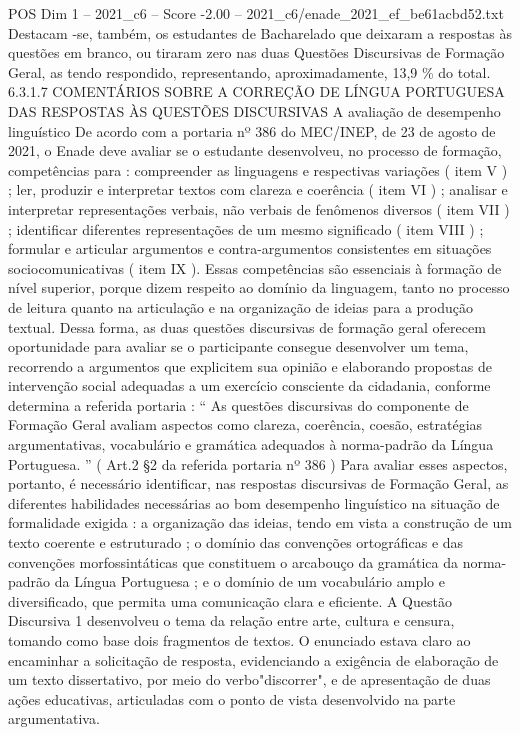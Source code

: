 \begin{textsample}{POS Dim 1 – 2021\_c6 – Score -2.00 – 2021\_c6/enade\_2021\_ef\_be61acbd52.txt}
Destacam -se, também, os estudantes de Bacharelado que deixaram a respostas às questões em branco, ou tiraram zero nas duas Questões Discursivas de Formação Geral, as tendo respondido, representando, aproximadamente, 13,9 \% do total. 6.3.1.7 COMENTÁRIOS SOBRE A CORREÇÃO DE LÍNGUA PORTUGUESA DAS RESPOSTAS ÀS QUESTÕES DISCURSIVAS A avaliação de desempenho linguístico De acordo com a portaria nº 386 do MEC/INEP, de 23 de agosto de 2021, o Enade deve avaliar se o estudante desenvolveu, no processo de formação, competências para : compreender as linguagens e respectivas variações ( item V ) ; ler, produzir e interpretar textos com clareza e coerência ( item VI ) ; analisar e interpretar representações verbais, não verbais de fenômenos diversos ( item VII ) ; identificar diferentes representações de um mesmo significado ( item VIII ) ; formular e articular argumentos e contra-argumentos consistentes em situações sociocomunicativas ( item IX ).
Essas competências são essenciais à formação de nível superior, porque dizem respeito ao domínio da linguagem, tanto no processo de leitura quanto na articulação e na organização de ideias para a produção textual.
Dessa forma, as duas questões discursivas de formação geral oferecem oportunidade para avaliar se o participante consegue desenvolver um tema, recorrendo a argumentos que explicitem sua opinião e elaborando propostas de intervenção social adequadas a um exercício consciente da cidadania, conforme determina a referida portaria : “ As questões discursivas do componente de Formação Geral avaliam aspectos como clareza, coerência, coesão, estratégias argumentativas, vocabulário e gramática adequados à norma-padrão da Língua Portuguesa. ” ( Art.2 §2 da referida portaria nº 386 ) Para avaliar esses aspectos, portanto, é necessário identificar, nas respostas discursivas de Formação Geral, as diferentes habilidades necessárias ao bom desempenho linguístico na situação de formalidade exigida : a organização das ideias, tendo em vista a construção de um texto coerente e estruturado ; o domínio das convenções ortográficas e das convenções morfossintáticas que constituem o arcabouço da gramática da norma-padrão da Língua Portuguesa ; e o domínio de um vocabulário amplo e diversificado, que permita uma comunicação clara e eficiente.
A Questão Discursiva 1 desenvolveu o tema da relação entre arte, cultura e censura, tomando como base dois fragmentos de textos.
O enunciado estava claro ao encaminhar a solicitação de resposta, evidenciando a exigência de elaboração de um texto dissertativo, por meio do verbo"discorrer", e de apresentação de duas ações educativas, articuladas com o ponto de vista desenvolvido na parte argumentativa.

\end{textsample}
